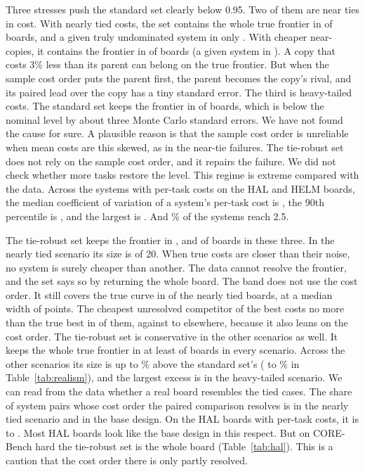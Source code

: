 \documentclass[11pt]{article}
\begin{document}
Three stresses push the standard set clearly below 0.95. Two of them are near ties in cost. With nearly tied costs, the set contains the whole true frontier in \NumValScNearTiedCostsJoint{} of boards, and a given truly undominated system in only \NumValScNearTiedCostsPerSystem{}. With cheaper near-copies, it contains the frontier in \NumValScCheaperNearCopiesJoint{} of boards (a given system in \NumValScCheaperNearCopiesPerSystem{}). A copy that costs 3\% less than its parent can belong on the true frontier. But when the sample cost order puts the parent first, the parent becomes the copy's rival, and its paired lead over the copy has a tiny standard error. The third is heavy-tailed costs. The standard set keeps the frontier in \NumValScHeavyTailedCostsJoint{} of boards, which is below the nominal level by about three Monte Carlo standard errors. We have not found the cause for sure. A plausible reason is that the sample cost order is unreliable when mean costs are this skewed, as in the near-tie failures. The tie-robust set does not rely on the sample cost order, and it repairs the failure. We did not check whether more tasks restore the level. This regime is extreme compared with the data. Across the systems with per-task costs on the HAL and HELM boards, the median coefficient of variation of a system's per-task cost is \NumCostCvMedian{}, the 90th percentile is \NumCostCvNinety{}, and the largest is \NumCostCvMax{}. And \NumCostCvShareHeavy\% of the systems reach 2.5.

The tie-robust set keeps the frontier in \NumValScNearTiedCostsRobJoint{}, \NumValScCheaperNearCopiesRobJoint{} and \NumValScHeavyTailedCostsRobJoint{} of boards in these three. In the nearly tied scenario its size is \NumValScNearTiedCostsRobSize{} of 20. When true costs are closer than their noise, no system is surely cheaper than another. The data cannot resolve the frontier, and the set says so by returning the whole board. The band does not use the cost order. It still covers the true curve in \NumValScNearTiedCostsBand{} of the nearly tied boards, at a median width of \NumValScNearTiedCostsBandWidth{} points. The cheapest unresolved competitor of the best costs no more than the true best in \NumValScNearTiedCostsCpbOk{} of them, against \NumValCpbOkOtherMin{} to \NumValCpbOkOtherMax{} elsewhere, because it also leans on the cost order. The tie-robust set is conservative in the other scenarios as well. It keeps the whole true frontier in at least \NumValRobJointMinAll{} of boards in every scenario. Across the other scenarios its size is up to \NumValRobExcessMax\% above the standard set's (\NumValRobExcessTabMin{} to \NumValRobExcessTabMax\% in Table~\ref{tab:realism}), and the largest excess is in the heavy-tailed scenario. We can read from the data whether a real board resembles the tied cases. The share of system pairs whose cost order the paired comparison resolves is \NumCostSepSimTied{} in the nearly tied scenario and \NumCostSepSimBase{} in the base design. On the HAL boards with per-task costs, it is \NumCostSepHalMin{} to \NumCostSepHalMax{}. Most HAL boards look like the base design in this respect. But on CORE-Bench hard the tie-robust set is the whole board (Table~\ref{tab:hal}). This is a caution that the cost order there is only partly resolved.
\end{document}
